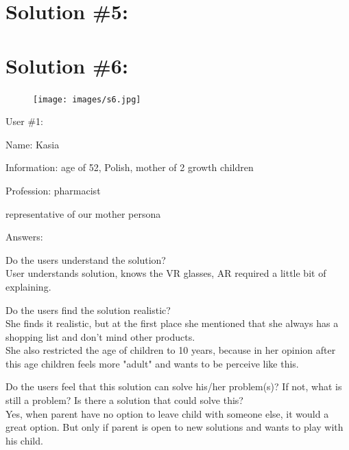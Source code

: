 \documentclass[a4paper,10pt,oneside]{scrreprt}
\begin{document}
\clearpage
\section{Solution \#5:}

\clearpage
\section{Solution \#6:}

\begin{figure}[H]
	\centering
	\texttt{[image: images/s6.jpg]}
\end{figure}


User \#1:
\begin{compactitem}
	\item Name: Kasia
	\item Information: age of 52, Polish, mother of 2 growth children
	\item Profession: pharmacist
	\item representative of our mother persona
\end{compactitem}
\bigskip

Answers:
\begin{compactitem}
	\item Do the users understand the solution?\\
	User understands solution, knows the VR glasses, AR required a little bit of explaining.\\
	
	
	\item Do the users find the solution realistic?\\
	She finds it realistic, but at the first place she mentioned that she always has a shopping list and don't mind other products.\\
    She also restricted the age of children to 10 years, because in her opinion after this age children feels more "adult" and wants to be perceive like this.\\
	
	\item Do the users feel that this solution can solve his/her problem(s)? If not, what is still
	a problem? Is there a solution that could solve this?\\
	Yes, when parent have no option to leave child with someone else, it would a great option. But only if parent is open to new solutions and wants to play with his child.\\
\end{compactitem}
\bigskip
\end{document}
